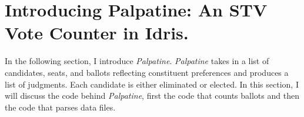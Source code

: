 \chapter{Introducing Palpatine: An STV Vote Counter in Idris.}

In the following section, I introduce \textit{Palpatine}. \textit{Palpatine}
takes in a list of candidates, seats, and ballots reflecting constituent
preferences and produces a list of judgments. Each candidate is either
eliminated or elected. In this section, I will discuss the code behind
\textit{Palpatine}, first the code that counts ballots and then the code that
parses data files. 


\clearpage

\clearpage

\clearpage
